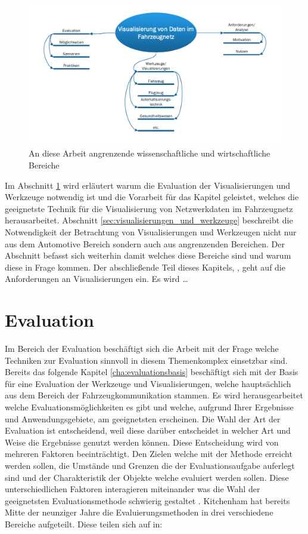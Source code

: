 \documentclass[draft=false
              ,paper=a4
              ,twoside=false
              ,fontsize=11pt
              ,headsepline
              ,BCOR10mm
              ,DIV11
              ]{scrbook}
\begin{document}
\begin{figure}[htbp]
  \centering
  \includegraphics[width=\textwidth]{img/theme_overview.pdf}
  \caption{An diese Arbeit angrenzende wissenschaftliche und wirtschaftliche Bereiche}
  \label{fig:theme_overview}
\end{figure}

Im Abschnitt \ref{sec:evaluation} wird erläutert warum die Evaluation der Visualisierungen und Werkzeuge notwendig ist und die Vorarbeit für das Kapitel  geleistet, welches die geeignetste Technik für die Visualisierung von Netzwerkdaten im Fahrzeugnetz herausarbeitet. Abschnitt \ref{sec:visualisierungen_und_werkzeuge} beschreibt die Notwendigkeit der Betrachtung von Visualisierungen und Werkzeugen nicht nur aus dem Automotive Bereich sondern auch aus angrenzenden Bereichen. Der Abschnitt befasst sich weiterhin damit welches diese Bereiche sind und warum diese in Frage kommen. Der abschließende Teil dieses Kapitels, , geht auf die Anforderungen an Visualisierungen ein. Es wird \dots 

\section{Evaluation} %
\label{sec:evaluation}

Im Bereich der Evaluation beschäftigt sich die Arbeit mit der Frage welche Techniken zur Evaluation sinnvoll in diesem Themenkomplex einsetzbar sind. Bereits das folgende Kapitel \ref{cha:evaluationsbasis} beschäftigt sich mit der Basis für eine Evaluation der Werkzeuge und Visualisierungen, welche hauptsächlich aus dem Bereich der Fahrzeugkommunikation stammen. Es wird herausgearbeitet welche Evaluationsmöglichkeiten es gibt und welche, aufgrund Ihrer Ergebnisse und Anwendungsgebiete, am geeignetsten erscheinen. Die Wahl der Art der Evaluation ist entscheidend, weil diese darüber entscheidet in welcher Art und Weise die Ergebnisse genutzt werden können. Diese Entscheidung wird von mehreren Faktoren beeinträchtigt. Den Zielen welche mit der Methode erreicht werden sollen, die Umstände und Grenzen die der Evaluationsaufgabe auferlegt sind und der Charakteristik der Objekte welche evaluiert werden sollen. Diese unterschiedlichen Faktoren interagieren miteinander was die Wahl der geeignetsten Evaluationsmethode schwierig gestaltet \cite{kitchenham_evaluating_1996-2}. Kitchenham hat bereits Mitte der neunziger Jahre die Evaluierungsmethoden in drei verschiedene Bereiche aufgeteilt. Diese teilen sich auf in:
\end{document}
